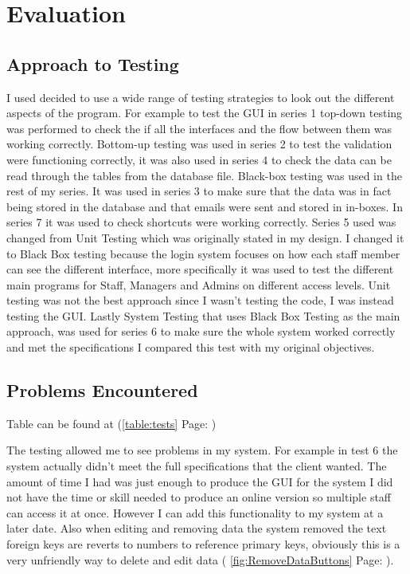 \section{Evaluation}

\subsection{Approach to Testing}

I used decided to use a wide range of testing strategies to look out the different aspects of the program. For example to test the GUI in series 1 top-down testing was performed to check the if all the interfaces and the flow between them was working correctly. Bottom-up testing was used in series 2 to test the validation were functioning correctly, it was also used in series 4 to check the data can be read through the tables from the database file. Black-box testing was used in the rest of my series. It was used in series 3 to make sure that the data was in fact being stored in the database and that emails were sent and stored in in-boxes. In series 7 it was used to check shortcuts were working correctly. Series 5 used was changed from Unit Testing which was originally stated in my design. I changed it to Black Box testing because the login system focuses on how each staff member can see the different interface, more specifically it was used to test the different main programs for Staff, Managers and Admins on different access levels. Unit testing was not the best approach since I wasn't testing the code, I was instead testing the GUI. Lastly System Testing that uses Black Box Testing as the main approach, was used for series 6 to make sure the whole system worked correctly and met the specifications I compared this test with my original objectives.

\subsection{Problems Encountered}

Table can be found at (\ref{table:tests} Page: \pageref{table:tests})

The testing allowed me to see problems in my system. For example in test 6 the system actually didn't meet the full specifications that the client wanted. The amount of time I had was just enough to produce the GUI for the system I did not have the time or skill needed to produce an online version so multiple staff can access it at once. However I can add this functionality to my system at a later date. Also when editing and removing data the system removed the text foreign keys are reverts to numbers to reference primary keys, obviously this is a very unfriendly way to delete and edit data ( \ref{fig:RemoveDataButtons} Page: \pageref{fig:RemoveDataButtons}).

